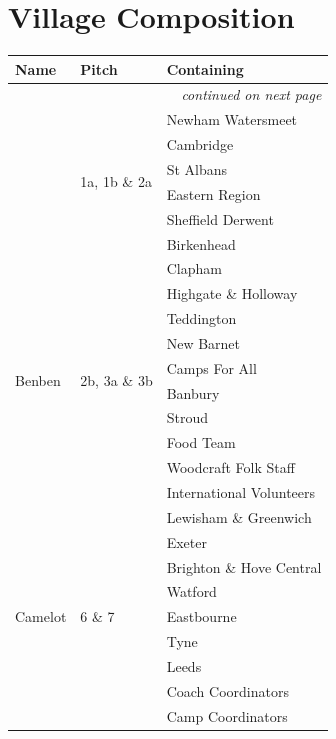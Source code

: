 \documentclass[a4paper, 11pt]{report}
\begin{document}
\section{Village Composition}
{\RaggedRight \centering
\begin{longtable}{p{} p{} p{}}
    \textbf{Name} & \textbf{Pitch} & \textbf{Containing}\\
        \hline
        \endhead

        \multicolumn{3}{r}{\footnotesize\itshape continued on next page}\\
        \endfoot 
        
        \endlastfoot
        \multirow{6}{*}{Asgard} & \multirow{6}{*}{1a, 1b \& 2a} & Newham Watersmeet\\*
        & & Cambridge\\*
        & & St Albans\\*
        & & Eastern Region\\*
        & & Sheffield Derwent\\*
        & & Birkenhead\\
        \hline

        \multirow{10}{*}{Benben} & \multirow{10}{*}{2b, 3a \& 3b} & Clapham\\*
        & &  Highgate \& Holloway \\*
        & &  Teddington \\*
        & &  New Barnet \\*
        & &  Camps For All \\*
        & &  Banbury \\*
        & &  Stroud \\*
        & &  Food Team \\*
        & &  Woodcraft Folk Staff \\*
        & &  International Volunteers \\*
        \hline

        \multirow{9}{*}{Camelot} & \multirow{9}{*}{6 \& 7} & Lewisham \& Greenwich\\*
        & & Exeter \\*
        & & Brighton \& Hove Central \\*
        & & Watford \\*
        & & Eastbourne \\*
        & & Tyne \\*
        & & Leeds \\*
        & & Coach Coordinators \\*
        & & Camp Coordinators \\
        \hline


\end{longtable}}
\end{document}
